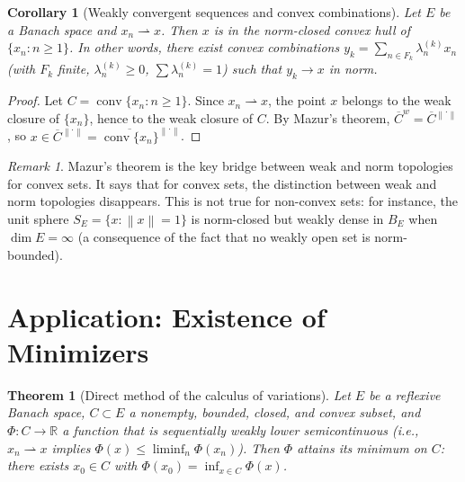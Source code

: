 \documentclass[a4paper,12pt]{book}
\DeclareMathOperator{\conv}{conv}
\newcommand{\R}{\mathbb{R}}
\newcommand{\norm}[1]{\left\| #1 \right\|}
\newcommand{\weakto}{\rightharpoonup}
\theoremstyle{definition}
\theoremstyle{plain}
\newtheorem{theorem}[definition]{Theorem}
\newtheorem{corollary}[definition]{Corollary}
\theoremstyle{remark}
\newtheorem{remark}[definition]{Remark}
\begin{document}
\begin{corollary}[Weakly convergent sequences and convex combinations]\label{cor:mazur-convex-comb}
Let $E$ be a Banach space and $x_n\weakto x$.  Then $x$ is in the
norm-closed convex hull of $\{x_n:n\ge 1\}$.  In other words, there exist
convex combinations $y_k = \sum_{n\in F_k}\lambda_n^{(k)}x_n$ (with
$F_k$ finite, $\lambda_n^{(k)}\ge 0$, $\sum\lambda_n^{(k)}=1$)
such that $y_k\to x$ in norm.
\end{corollary}

\begin{proof}
Let $C = \conv\{x_n:n\ge 1\}$.  Since $x_n\weakto x$, the point $x$ belongs
to the weak closure of $\{x_n\}$, hence to the weak closure of $C$.
By Mazur's theorem, $\overline{C}^{w} = \overline{C}^{\norm{\cdot}}$, so
$x\in\overline{C}^{\norm{\cdot}} = \overline{\conv\{x_n\}}^{\norm{\cdot}}$.
\end{proof}

\begin{remark}\label{rem:mazur-significance}
Mazur's theorem is the key bridge between weak and norm topologies for convex
sets.  It says that for convex sets, the distinction between weak and norm
topologies disappears.  This is not true for non-convex sets: for instance,
the unit sphere $S_E = \{x:\norm{x}=1\}$ is norm-closed but weakly dense
in $B_E$ when $\dim E=\infty$ (a consequence of the fact that no weakly open
set is norm-bounded).
\end{remark}

\section{Application: Existence of Minimizers}\label{sec:minimizers}

\begin{theorem}[Direct method of the calculus of variations]\label{thm:direct-method}
Let $E$ be a reflexive Banach space, $C\subset E$ a nonempty, bounded, closed,
and convex subset, and $\Phi: C\to\R$ a function that is sequentially weakly
lower semicontinuous (i.e., $x_n\weakto x$ implies
$\Phi(x)\le\liminf_n\Phi(x_n)$).  Then $\Phi$ attains its minimum on $C$:
there exists $x_0\in C$ with $\Phi(x_0)=\inf_{x\in C}\Phi(x)$.
\end{theorem}
\end{document}
